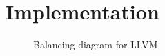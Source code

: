 \section{Implementation}
\label{implementation}

\begin{figure}[h]
  \caption{Balancing diagram for LLVM}
\end{figure}
